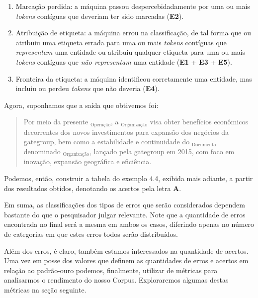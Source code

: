 \documentclass[11pt]{report}
\begin{document}
\begin{enumerate}[label=\textbf{e\arabic*.}]
  \item Marcação perdida: a máquina passou despercebidadamente por uma ou mais \textit{tokens} contíguas que deveriam ter sido marcadas (\textbf{E2}).
  \item Atribuição de etiqueta: a máquina errou na classificação, de tal forma que ou atribuiu uma etiqueta errada  para uma ou mais \textit{tokens}
  contíguas que \textit{representam} uma entidade ou atribuiu qualquer etiqueta para uma ou mais \textit{tokens} contíguas que \textit{não representam} uma entidade
  (\textbf{E1} + \textbf{E3} + \textbf{E5}).
  \item Fronteira da etiqueta: a máquina identificou corretamente uma entidade, mas incluiu ou perdeu \textit{tokens} que não deveria (\textbf{E4}).
\end{enumerate}

Agora, suponhamos que a saída que obtivemos foi:

\begin{quote}
  \begin{varwidth}{0.89\textwidth}
  Por meio da presente $_{\text{Operação}}$, a $_{\text{Organização}}$ visa obter benefícios econômicos decorrentes dos novos investimentos
  para expansão dos negócios da gategroup,
  bem como a  estabilidade e  continuidade do $_{\text{Documento}}$ denominado $_{\text{Organização}}$, lançado pela gategroup
  em 2015, com foco em inovação, expansão geográfica e eficiência.
  \end{varwidth}
\end{quote}

Podemos, então, construir a tabela do exemplo 4.4, exibida mais adiante, a partir dos resultados obtidos, denotando os acertos pela letra \textbf{A}.

Em suma, as classificações dos tipos de erros que
serão considerados dependem bastante do que o pesquisador julgar relevante. Note que a quantidade de erros encontrada no final será a mesma em ambos os casos,
diferindo apenas no número de categorias em que estes erros todos serão distribuídos.

Além dos erros, é claro, também estamos interessados na quantidade de acertos. Uma vez em posse dos valores que definem as quantidades de erros e acertos em relação
ao padrão-ouro podemos, finalmente, utilizar de métricas para analisarmos o rendimento do nosso Corpus. Exploraremos algumas destas métricas na seção seguinte.
\end{document}
